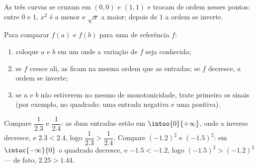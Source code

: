\begin{omfigure}

{\small As três curvas se cruzam em $(0,0)$ e $(1,1)$ e trocam de ordem
nesses pontos: entre $0$ e $1$, $x^2$ é a menor e $\sqrt x$ a maior;
depois de $1$ a ordem se inverte.}
\end{omfigure}

\begin{method}\label{met:g10:reffunc:compare}
Para comparar $f(a)$ e $f(b)$ para uma  de referência $f$:
\begin{enumerate}
  \item coloque $a$ e $b$ em um  onde a variação de $f$ seja
        conhecida;
  \item se $f$ cresce ali, as  ficam na mesma ordem que as
        entradas; se $f$ decresce, a ordem se inverte;
  \item se $a$ e $b$ não estiverem no mesmo  de monotonicidade,
        trate primeiro os sinais (por exemplo, no quadrado: uma entrada
        negativa e uma positiva).
\end{enumerate}
\end{method}

\begin{example}
Compare $\dfrac{1}{2.3}$ e $\dfrac{1}{2.4}$: as duas entradas estão em
$\intoo{0}{+\infty}$, onde a  inverso decresce, e $2.3 < 2.4$, logo
$\dfrac{1}{2.3} > \dfrac{1}{2.4}$. Compare $(-1.2)^2$ e $(-1.5)^2$: em
$\intoc{-\infty}{0}$ o quadrado decresce, e $-1.5 < -1.2$, logo
$(-1.5)^2 > (-1.2)^2$ --- de fato, $2.25 > 1.44$.
\end{example}

